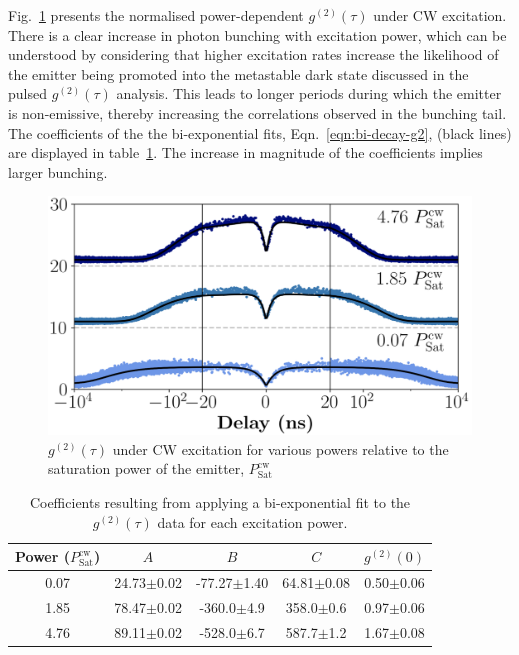 Fig.~\ref{fig:cwg2} presents the normalised power-dependent $g^{(2)}(\tau)$ under CW excitation. There is a clear increase in photon bunching with excitation power, which can be understood by considering that higher excitation rates increase the likelihood of the emitter being promoted into the metastable dark state discussed in the pulsed $g^{(2)}(\tau)$ analysis. This leads to longer periods during which the emitter is non-emissive, thereby increasing the correlations observed in the bunching tail. The coefficients of the the bi-exponential fits, Eqn.~\ref{eqn:bi-decay-g2}, (black lines) are displayed in table~\ref{tab:g2coeff}. The increase in magnitude of the coefficients implies larger bunching. 

\begin{figure}[h!]
    \centering
    \includegraphics[width=0.9\linewidth]{Figures/CWg2.png}
    \caption{$g^{(2)}(\tau)$ under CW excitation for various powers relative to the saturation power of the emitter, $P_{\text{Sat}}^{\text{cw}}$}
    \label{fig:cwg2}
\end{figure}

\begin{table}[h!]
\centering
\begin{tabular}{|c|c|c|c|c|}
\hline
\textbf{Power ($P^{\text{cw}}_{\text{Sat}}$)} & $A$ & $B$ & $C$ & $g^{(2)}(0)$ \\
\hline
0.07 &     24.73$\pm$0.02     &   -77.27$\pm$1.40  & 64.81$\pm$0.08   & 0.50$\pm$0.06 \\
\hline
1.85 &      78.47$\pm$0.02      &    -360.0$\pm$4.9  & 358.0$\pm$0.6& 0.97$\pm$0.06 \\
\hline
4.76 &      89.11$\pm$0.02       &    -528.0$\pm$6.7   & 587.7$\pm$1.2   & 1.67$\pm$0.08 \\
\hline
\end{tabular}
\caption{Coefficients resulting from applying a bi-exponential fit to the $g^{(2)}(\tau)$ data for each excitation power.}
\label{tab:g2coeff}
\end{table}

